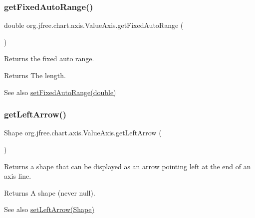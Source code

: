 \subsubsection{\texorpdfstring{get\+Fixed\+Auto\+Range()}{getFixedAutoRange()}}
{\footnotesize\ttfamily double org.\+jfree.\+chart.\+axis.\+Value\+Axis.\+get\+Fixed\+Auto\+Range (\begin{DoxyParamCaption}{ }\end{DoxyParamCaption})}

Returns the fixed auto range.

\begin{DoxyReturn}{Returns}
The length.
\end{DoxyReturn}
\begin{DoxySeeAlso}{See also}
\mbox{\hyperlink{classorg_1_1jfree_1_1chart_1_1axis_1_1_value_axis_a35c73feedf55ee5dba21cd4aba5014d8}{set\+Fixed\+Auto\+Range(double)}} 
\end{DoxySeeAlso}
\mbox{\label{classorg_1_1jfree_1_1chart_1_1axis_1_1_value_axis_a68bc86e19cb0a68264f057981ecb4963}} 
\subsubsection{\texorpdfstring{get\+Left\+Arrow()}{getLeftArrow()}}
{\footnotesize\ttfamily Shape org.\+jfree.\+chart.\+axis.\+Value\+Axis.\+get\+Left\+Arrow (\begin{DoxyParamCaption}{ }\end{DoxyParamCaption})}

Returns a shape that can be displayed as an arrow pointing left at the end of an axis line.

\begin{DoxyReturn}{Returns}
A shape (never {\ttfamily null}).
\end{DoxyReturn}
\begin{DoxySeeAlso}{See also}
\mbox{\hyperlink{classorg_1_1jfree_1_1chart_1_1axis_1_1_value_axis_a780dc600f43e8e1df3353ed44d77b0a8}{set\+Left\+Arrow(\+Shape)}} 
\end{DoxySeeAlso}
\mbox{\label{classorg_1_1jfree_1_1chart_1_1axis_1_1_value_axis_afaef2ebef47d76549601084111009521}} 
